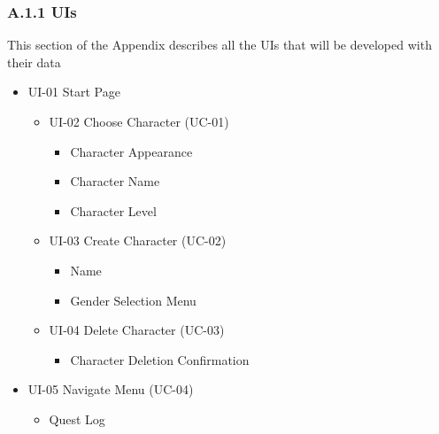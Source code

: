 \documentclass[12pt]{report}
\renewcommand{\_}{\kern-1.5pt\textunderscore\kern-1.5pt}
\begin{document}
\subsubsection*{A.1.1 UIs}
This section of the Appendix describes all the UIs that will be developed with their data\par
\begin{itemize}
	\item UI-01 Start Page\par

\begin{itemize}
	\item UI-02 Choose Character (UC-01)\par

\begin{itemize}
	\item Character Appearance\par

	\item Character Name\par

	\item Character Level\par


\end{itemize}
	\item UI-03 Create Character (UC-02)\par

\begin{itemize}
	\item Name\par

	\item Gender Selection Menu\par


\end{itemize}
	\item UI-04 Delete Character (UC-03)\par

\begin{itemize}
	\item Character Deletion Confirmation\par


\end{itemize}
\end{itemize}
	\item UI-05 Navigate Menu (UC-04)\par

\begin{itemize}
	\item Quest Log\par


\end{itemize}
\end{itemize}
\end{document}
